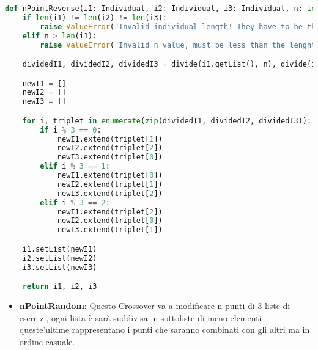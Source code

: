 \documentclass{article}
\begin{document}
\begin{lstlisting}[language=Python, breaklines, no caption]
def nPointReverse(i1: Individual, i2: Individual, i3: Individual, n: int) -> tuple[Individual, Individual, Individual]:
    if len(i1) != len(i2) != len(i3):
        raise ValueError("Invalid individual length! They have to be the same.")
    elif n > len(i1):
        raise ValueError("Invalid n value, must be less than the lenght of the individual!")

    dividedI1, dividedI2, dividedI3 = divide(i1.getList(), n), divide(i2.getList(), n), divide(i3.getList(), n)

    newI1 = []
    newI2 = []
    newI3 = []

    for i, triplet in enumerate(zip(dividedI1, dividedI2, dividedI3)):
        if i % 3 == 0:
            newI1.extend(triplet[1])
            newI2.extend(triplet[2])
            newI3.extend(triplet[0])
        elif i % 3 == 1:
            newI1.extend(triplet[0])
            newI2.extend(triplet[1])
            newI3.extend(triplet[2])
        elif i % 3 == 2:
            newI1.extend(triplet[2])
            newI2.extend(triplet[0])
            newI3.extend(triplet[1])

    i1.setList(newI1)
    i2.setList(newI2)
    i3.setList(newI3)

    return i1, i2, i3
        \end{lstlisting}

        \pagebreak

\begin{itemize}
\item\textbf{nPointRandom}: Questo Crossover va a modificare n punti di 3 liste di esercizi, ogni lista è sarà suddivisa in sottoliste di meno elementi queste'ultime rappresentano i punti che saranno combinati con gli altri ma in ordine casuale.
\end{itemize}
\end{document}
